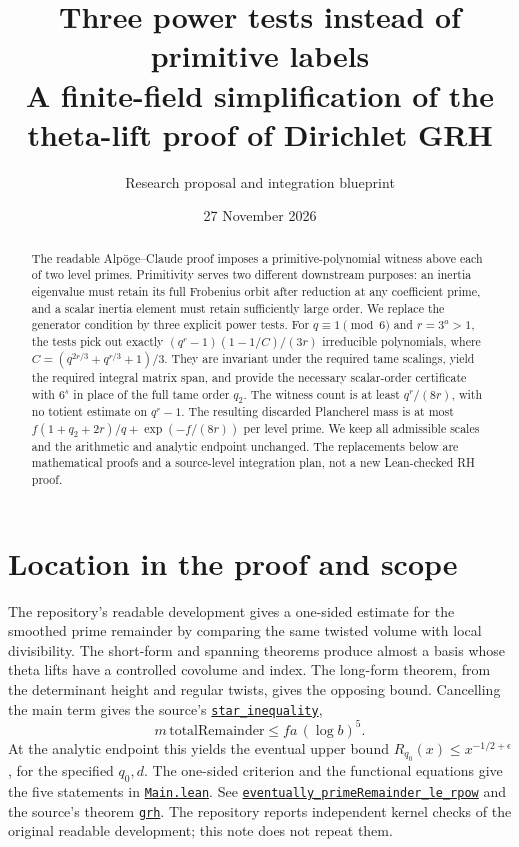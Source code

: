 \documentclass[11pt]{article}
\title{\vspace{-1.2em}\textbf{Three power tests instead of primitive labels}\\[4pt]\large A finite-field simplification of the theta-lift proof of Dirichlet GRH}
\author{Research proposal and integration blueprint}
\date{27 November 2026}
\theoremstyle{definition}\newtheorem{definition}[theorem]{Definition}
\newcommand{\src}[2]{\href{https://github.com/VladimirReshetnikov/ProveIt/blob/ee10f937fedac0955d28b7b860f4c44fab508204/Analysis/GeneralizedRiemannHypothesis/Lean/grh/src/#1}{\texttt{#2}}}
\begin{document}
\maketitle
\begin{abstract}
The readable Alp\"oge--Claude proof imposes a primitive-polynomial witness above each of two level primes. Primitivity serves two different downstream purposes: an inertia eigenvalue must retain its full Frobenius orbit after reduction at any coefficient prime, and a scalar inertia element must retain sufficiently large order. We replace the generator condition by three explicit power tests. For $q\equiv1\pmod6$ and $r=3^a>1$, the tests pick out exactly $(q^r-1)(1-1/C)/(3r)$ irreducible polynomials, where $C=(q^{2r/3}+q^{r/3}+1)/3$. They are invariant under the required tame scalings, yield the required integral matrix span, and provide the necessary scalar-order certificate with $6^s$ in place of the full tame order $q_2$. The witness count is at least $q^r/(8r)$, with no totient estimate on $q^r-1$. The resulting discarded Plancherel mass is at most $f(1+q_2+2r)/q+\exp(-f/(8r))$ per level prime. We keep all admissible scales and the arithmetic and analytic endpoint unchanged. The replacements below are mathematical proofs and a source-level integration plan, not a new Lean-checked RH proof.
\end{abstract}
\tableofcontents

\section{Location in the proof and scope}
The repository's readable development gives a one-sided estimate for the smoothed prime remainder by comparing the same twisted volume with local divisibility. The short-form and spanning theorems produce almost a basis whose theta lifts have a controlled covolume and index. The long-form theorem, from the determinant height and regular twists, gives the opposing bound. Cancelling the main term gives the source's \src{New/Reduction/MainInequality.lean\#L87}{star\_inequality},
\[
       m\,\mathrm{totalRemainder}\le f a\,(\log b)^5.
\]
At the analytic endpoint this yields the eventual upper bound $R_{q_0}(x)\le x^{-1/2+\epsilon}$, for the specified $q_0,d$. The one-sided criterion and the functional equations give the five statements in \src{Main.lean}{Main.lean}. See \src{New/Reduction/OneSidedBound.lean\#L200}{eventually\_primeRemainder\_le\_rpow} and the source's theorem \src{New/Reduction/OneSidedBound.lean\#L239}{grh}. The repository reports independent kernel checks of the original readable development; this note does not repeat them.
\end{document}
